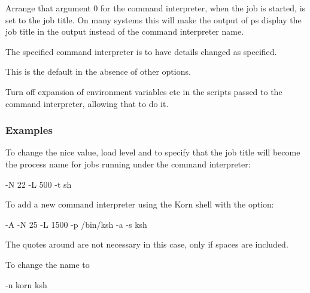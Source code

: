 
Arrange that argument 0 for the command interpreter, when the job is started, is set to the job
title. On many systems this will make the output of ps display the job title in the output instead of the command interpreter name.


The specified command interpreter is to have details changed as specified.

This is the default in the absence of other options.


Turn off expansion of environment variables etc in the scripts passed to the command interpreter, allowing that to do it.


\subsubsection{Examples}
To change the nice value, load level and to specify that the job title will become the process name for jobs running under the  command
interpreter:

\begin{expara}

\BtcichangeName{} -N 22 -L 500 -t sh

\end{expara}

To add a new command interpreter using the Korn shell with the  option:

\begin{expara}

\BtcichangeName{} -A -N 25 -L 1500 -p /bin/ksh -a {\textquotesingle}-s{\textquotesingle} ksh

\end{expara}

The quotes around  are not necessary in this case, only if spaces are included.

To change the name to 

\begin{expara}

\BtcichangeName{} -n korn ksh

\end{expara}

